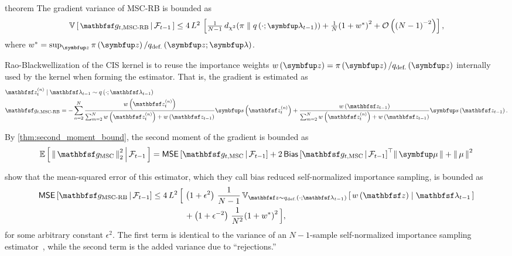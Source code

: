 \begin{theoremEnd}{theorem}{\citep{cardoso_brsnis_2022}}\label{thm:mscrb}
  The gradient variance of MSC-RB is bounded as
  \begin{align*}
  {\textstyle\small
    \V{ \rvvg_{t,\mathrm{MSC\text{-}RB}} \,\middle|\, \mathcal{F}_{t-1} } \leq
    4\,L^2 \, \left[
    \frac{1}{N-1}\,\DChi{\pi}{q\left(\cdot; \vlambda_{t-1}\right)}
    +
    \frac{1}{N} {\left(1 + w^*\right)}^2
    +
    \mathcal{O}\left({\left(N-1\right)}^{-2}\right)
    \right],
  }
  \end{align*}
  where \(w^* = \sup_{\vz} \pi\left(\vz\right) / q_{\text{def.}}\left(\vz;\vlambda\right)\).
\end{theoremEnd}
\begin{proofEnd}
  Rao-Blackwellization of the CIS kernel is to reuse the importance weights \(w\left(\vz\right) = \pi\left(\vz\right) / q_{\text{def.}}\left(\vz\right)\) internally used by the kernel when forming the estimator.
  That is, the gradient is estimated as
  \begin{align*}
    &\rvvz^{(n)}_t \mid \rvvlambda_{t-1} \sim q\left(\cdot; \rvvlambda_{t-1}\right) \\
    &\rvvg_{t,\text{MSC-RB}} = -\sum^{N}_{n=2} \frac{w\left(\rvvz^{(n)}_t\right)}{\sum^{N}_{m=2}w\left(\rvvz^{(n)}_t\right) + w\left(\rvvz_{t-1}\right)} \vs\left(\rvvz^{(n)}_t\right) + \frac{w\left(\rvvz_{t-1}\right)}{\sum^{N}_{m=2}w\left(\rvvz^{(n)}_t\right) + w\left(\rvvz_{t-1}\right)} \vs\left(\rvvz_{t-1}\right).
  \end{align*}

  By \cref{thm:second_moment_bound}, the second moment of the gradient is bounded as
  \begin{alignat*}{2}
    \E{ \norm{ \rvvg_{\text{MSC}} }_2^2 \,\middle|\, \mathcal{F}_{t-1} } 
    =
    \mathsf{MSE}\left[ \rvvg_{t, \text{MSC}} \,\middle|\, \mathcal{F}_{t-1} \right]
    +
    2 \, {\mathsf{Bias}\left[ \rvvg_{t, \text{MSC}} \,\middle|\, \mathcal{F}_{t-1} \right]}^{\top} \norm{\vmu}
    + \norm{\mu}^2
  \end{alignat*}
  
  \citet[Theorem 3]{cardoso_brsnis_2022} show that the mean-squared error of this estimator, which they call bias reduced self-normalized importance sampling, is bounded as
  \begin{align*}
    \mathsf{MSE}\left[ \rvvg_{\text{MSC-RB}} \,\middle|\, \mathcal{F}_{t-1} \right] \leq
    4\,L^2 \, \Big[\,&
     \left( 1 + \epsilon^2 \right)\, \frac{1}{N-1}\,\Vsub{\rvvz \sim q_{\text{def.}}\left(\cdot; \rvvlambda_{t-1}\right)}{w\left(\rvvz\right) \mid \rvvlambda_{t-1}} 
     \\
     &+
     \left(1 + \epsilon^{-2} \right)\, \frac{1}{N^2} {\left(1 + w^*\right)}^2 
    \,\Big],
  \end{align*}
  for some arbitrary constant \(\epsilon^2\).
  The first term is identical to the variance of an \(N-1\)-sample self-normalized importance sampling estimator~\citep{10.1214/17-STS611}, while the second term is the added variance due to ``rejections.''


\end{proofEnd}
